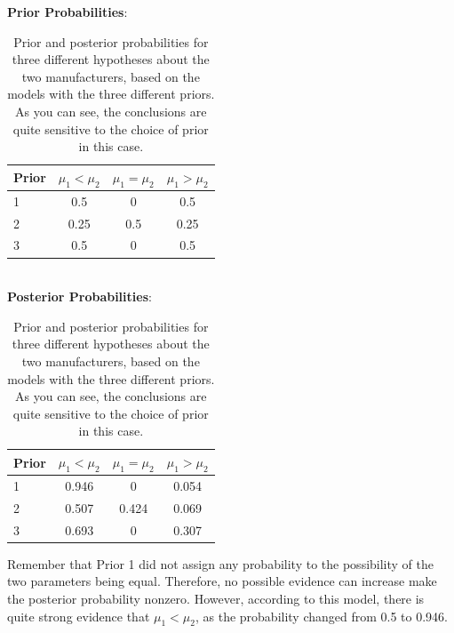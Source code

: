 \begin{table}
\begin{center}
{\bf Prior Probabilities}:\\
\begin{tabular}{|l|c|c|c|}
\hline
Prior	&	$\mu_1 < \mu_2$	& $\mu_1 = \mu_2$	& $\mu_1 > \mu_2$\\
\hline
1 	&	0.5		&	0		&	0.5\\
2 	&	0.25		&	0.5		&	0.25\\
3 	&	0.5		&	0		&	0.5\\
\hline
\end{tabular}\\
{\bf Posterior Probabilities}:\\
\begin{tabular}{|l|c|c|c|}
\hline
Prior	&	$\mu_1 < \mu_2$	& $\mu_1 = \mu_2$	& $\mu_1 > \mu_2$\\
\hline
1 	&	0.946		&	0		&	0.054\\
2 	&	0.507		&	0.424		&	0.069\\
3 	&	0.693		&	0		&	0.307\\
\hline
\end{tabular}
\caption{Prior and posterior probabilities for three different hypotheses about
the two manufacturers, based on the models with the three different priors.
As you can see, the conclusions are quite sensitive to the choice of prior in
this case.
\label{tab:ttest_results}}
\end{center}
\end{table}

Remember that Prior 1 did not assign any probability to the possibility of the
two parameters being equal. Therefore, no possible evidence can increase
make the posterior probability nonzero. However, according to this model, there
is quite strong evidence that $\mu_1 < \mu_2$, as the probability changed from
0.5 to 0.946.

